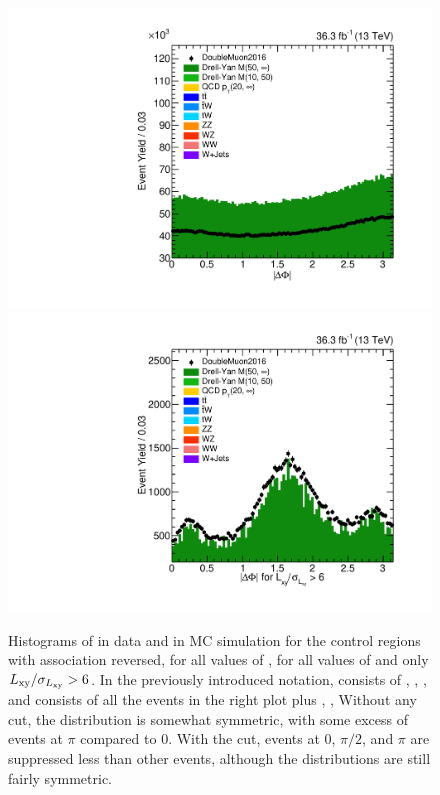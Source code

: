 \begin{figure}[htbp]
  \centering
  \includegraphics[width=\DSquareWidth]{figures/displaced/BGEST_NOPAT_deltaPhi_Lin.pdf}
  \hspace*{-2em}
  \includegraphics[width=\DSquareWidth]{figures/displaced/BGEST_NOPAT_deltaPhi-Big_Lin.pdf}
  \caption[Histograms of \DeltaPhi in data and in MC simulation for the control regions with \DSAToPAT association reversed, for all values of \DeltaPhi, for all values of \LxySig and for $\LxySig > 6$.]{Histograms of \DeltaPhi in data and in MC simulation for the control regions with \DSAToPAT association reversed, for all values of \DeltaPhi, for  all values of \LxySig and  only $\LxySig > 6$. In the previously introduced notation,  consists of , , \etc, and  consists of all the events in the right plot plus , , \etc Without any \LxySig cut, the distribution is somewhat symmetric, with some excess of events at $\pi$ compared to 0. With the \LxySig cut, events at 0, $\pi/2$, and $\pi$ are suppressed less than other events, although the distributions are still fairly symmetric.}
  \label{fig:dd:BGDeltaPhi_NoPAT}
\end{figure}

